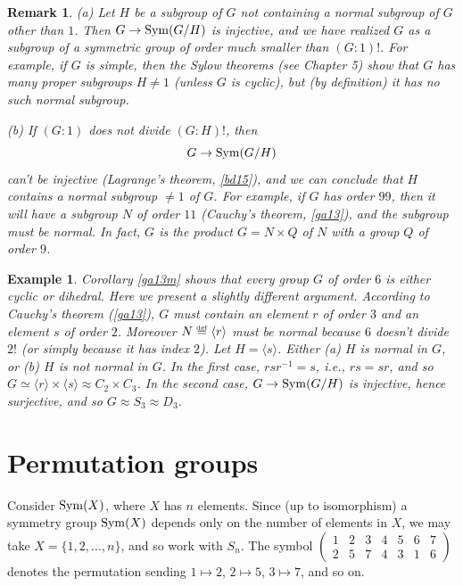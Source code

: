 \documentclass[a4paper,11pt,final,openany]{memoir}%
\newtheorem{example}[X]{Example}
\newtheorem{remark}[X]{Remark}
\theoremstyle{nonumberplain}
\begin{document}
\begin{remark}
\label{ga19} (a) Let $H$ be a subgroup of $G$ not containing a normal subgroup
of $G$ other than $1$. Then $G\rightarrow\operatorname{Sym}(G/H)$ is injective, and we have
realized $G$ as a subgroup of a symmetric group of order much smaller than
$(G:1)!$. For example, if $G$ is simple, then the Sylow theorems (see Chapter
5) show that $G$ has many proper subgroups $H\neq1$ (unless $G$ is cyclic),
but (by definition) it has no such normal subgroup.

(b) If $(G:1)$ does not divide $(G:H)!$, then
\[
G\rightarrow\operatorname{Sym}(G/H)
\]
can't be injective (Lagrange's theorem, \ref{bd15}), and we can conclude that
$H$ contains a normal subgroup $\neq1$ of $G$. For example, if $G$ has order
$99$, then it will have a subgroup $N$ of order $11$ (Cauchy's theorem,
\ref{ga13}), and the subgroup must be normal. In fact, $G$ is the product
$G=N\times Q$ of $N$ with a group $Q$ of order $9$.
\end{remark}

\begin{example}
\label{ga20} Corollary \ref{ga13m} shows that every group $G$ of order $6$ is
either cyclic or dihedral. Here we present a slightly different argument.
According to Cauchy's theorem (\ref{ga13}), $G$ must contain an element $r$ of
order $3$ and an element $s$ of order $2$. Moreover
$N\overset{\df}{=}\langle r\rangle$ must be normal because $6$
doesn't divide $2!$ (or simply because it has index $2$). Let $H=\langle
s\rangle$. Either (a) $H$ is normal in $G$, or (b) $H$ is not normal in $G$.
In the first case, $rsr^{-1}=s$, i.e., $rs=sr$, and so $G\simeq\langle
r\rangle\times\langle s\rangle\approx C_{2}\times C_{3}$. In the second case,
$G\rightarrow\operatorname{Sym}(G/H)$ is injective, hence surjective, and so $G\approx
S_{3}\approx D_{3}$.
\end{example}

\section{Permutation groups}

Consider $\operatorname{Sym}(X)$, where $X$ has $n$ elements. Since (up to isomorphism) a
symmetry group $\operatorname{Sym}(X)$ depends only on the number of elements in $X$, we may
take $X=\{1,2,\ldots,n\}$, and so work with $S_{n}$. The symbol $\left(
\begin{smallmatrix}
1 & 2 & 3 & 4 & 5 & 6 & 7\\
2 & 5 & 7 & 4 & 3 & 1 & 6
\end{smallmatrix}
\right)  $ denotes the permutation sending $1\mapsto2$, $2\mapsto5$,
$3\mapsto7$, and so on.
\end{document}
